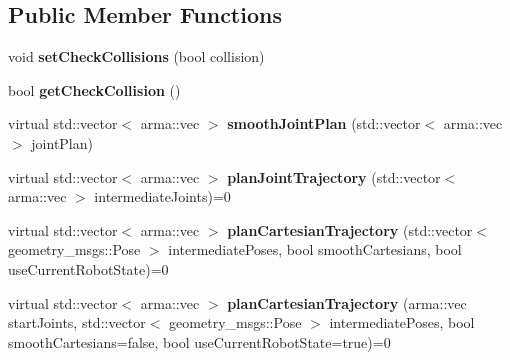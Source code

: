 \subsection*{Public Member Functions}
\begin{DoxyCompactItemize}
\item 
\hypertarget{classkukadu_1_1PathPlanner_a64bdab84aa8cf63b4c3a50f6ae0a9d7d}{void {\bfseries set\-Check\-Collisions} (bool collision)}\label{classkukadu_1_1PathPlanner_a64bdab84aa8cf63b4c3a50f6ae0a9d7d}

\item 
\hypertarget{classkukadu_1_1PathPlanner_ad807f61926f499a4b7dd277303156807}{bool {\bfseries get\-Check\-Collision} ()}\label{classkukadu_1_1PathPlanner_ad807f61926f499a4b7dd277303156807}

\item 
\hypertarget{classkukadu_1_1PathPlanner_ae10fe7292c94595d22a85b5f295af2bc}{virtual std\-::vector$<$ arma\-::vec $>$ {\bfseries smooth\-Joint\-Plan} (std\-::vector$<$ arma\-::vec $>$ joint\-Plan)}\label{classkukadu_1_1PathPlanner_ae10fe7292c94595d22a85b5f295af2bc}

\item 
\hypertarget{classkukadu_1_1PathPlanner_ab757c9af3406da8180bef68597b83542}{virtual std\-::vector$<$ arma\-::vec $>$ {\bfseries plan\-Joint\-Trajectory} (std\-::vector$<$ arma\-::vec $>$ intermediate\-Joints)=0}\label{classkukadu_1_1PathPlanner_ab757c9af3406da8180bef68597b83542}

\item 
\hypertarget{classkukadu_1_1PathPlanner_a959eb5545d65fdc108fdecad5d9d8542}{virtual std\-::vector$<$ arma\-::vec $>$ {\bfseries plan\-Cartesian\-Trajectory} (std\-::vector$<$ geometry\-\_\-msgs\-::\-Pose $>$ intermediate\-Poses, bool smooth\-Cartesians, bool use\-Current\-Robot\-State)=0}\label{classkukadu_1_1PathPlanner_a959eb5545d65fdc108fdecad5d9d8542}

\item 
\hypertarget{classkukadu_1_1PathPlanner_a7b3cf9ab52478e3d1775a17c9a6240e0}{virtual std\-::vector$<$ arma\-::vec $>$ {\bfseries plan\-Cartesian\-Trajectory} (arma\-::vec start\-Joints, std\-::vector$<$ geometry\-\_\-msgs\-::\-Pose $>$ intermediate\-Poses, bool smooth\-Cartesians=false, bool use\-Current\-Robot\-State=true)=0}\label{classkukadu_1_1PathPlanner_a7b3cf9ab52478e3d1775a17c9a6240e0}

\end{DoxyCompactItemize}
